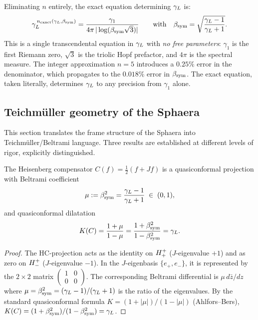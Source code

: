 \begin{remark}
\label{rem:exact-sc}
Eliminating $n$ entirely, the exact equation determining $\gamma_L$ is:
\[
 \gamma_L^{\,n_{\mathrm{exact}}(\gamma_L,\beta_{\mathrm{sym}})}
 = \frac{\gamma_1}{4\pi\,|\log(\beta_{\mathrm{sym}}\sqrt{3})|}
 \qquad\text{with}\quad \beta_{\mathrm{sym}} = \sqrt{\frac{\gamma_L-1}{\gamma_L+1}}.
\]
This is a single transcendental equation in $\gamma_L$ with \emph{no free
parameters}: $\gamma_1$ is the first Riemann zero, $\sqrt{3}$ is the
triolic Hopf prefactor, and $4\pi$ is the spectral measure.
The integer approximation $n=5$ introduces a $0.25\%$ error in the
denominator, which propagates to the $0.018\%$ error in $\beta_{\mathrm{sym}}$.
The exact equation, taken literally, determines $\gamma_L$ to any precision
from $\gamma_1$ alone.
\end{remark}

\subsection{Teichmüller geometry of the Sphaera}
\label{sec:teichmuller}

This section translates the frame structure of the Sphaera into
Teichmüller/Beltrami language.
Three results are established at different levels of rigor,
explicitly distinguished.

\begin{theorem}
\label{thm:hc-quasiconformal}
The Heisenberg compensator $C(f) = \tfrac{1}{2}(f+Jf)$ is a
quasiconformal projection with Beltrami coefficient
\[
 \mu := \beta_{\mathrm{sym}}^2 = \frac{\gamma_L-1}{\gamma_L+1} \;\in\; (0,1),
\]
and quasiconformal dilatation
\[
 K(C) = \frac{1+\mu}{1-\mu} = \frac{1+\beta_{\mathrm{sym}}^2}{1-\beta_{\mathrm{sym}}^2} = \gamma_L.
\]
\end{theorem}

\begin{proof}
The HC-projection acts as the identity on $H^+_+$ ($J$-eigenvalue $+1$)
and as zero on $H^+_-$ ($J$-eigenvalue $-1$).
In the $J$-eigenbasis $\{e_+,e_-\}$, it is represented by the
$2\times 2$ matrix $\begin{pmatrix}1&0\\0&0\end{pmatrix}$.
The corresponding Beltrami differential is $\mu\,d\bar z/dz$ where
$\mu = \beta_{\mathrm{sym}}^2 = (\gamma_L-1)/(\gamma_L+1)$ is the ratio of the eigenvalues.
By the standard quasiconformal formula
$K = (1+|\mu|)/(1-|\mu|)$ (Ahlfors--Bers),
$K(C) = (1+\beta_{\mathrm{sym}}^2)/(1-\beta_{\mathrm{sym}}^2) = \gamma_L$.
\end{proof}



